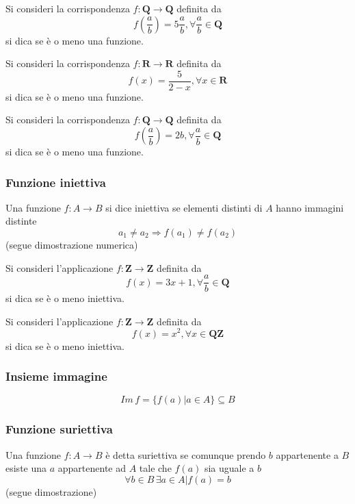 \begin{flushleft}
\begin{esercizio}
Si consideri la corrispondenza $f:\mathbf{Q}\to \mathbf{Q}$ definita da
\[f(\frac{a}{b}) = 5\frac{a}{b}, \forall \frac{a}{b}\in \mathbf{Q}\]
si dica se è o meno una funzione.
\end{esercizio}
\vspace{150px}

\begin{esercizio}
Si consideri la corrispondenza $f:\mathbf{R}\to \mathbf{R}$ definita da
\[f(x) = \frac{5}{2-x}, \forall x\in \mathbf{R}\]
si dica se è o meno una funzione.
\end{esercizio}
\vspace{150px}

\begin{esercizio}
Si consideri la corrispondenza $f:\mathbf{Q}\to \mathbf{Q}$ definita da
\[f(\frac{a}{b}) = 2b, \forall \frac{a}{b}\in \mathbf{Q}\]
si dica se è o meno una funzione.
\end{esercizio}
\vspace{150px}

\subsubsection{Funzione iniettiva}
Una funzione $f:A\to B$ si dice iniettiva se elementi distinti di $A$ hanno immagini distinte
\[a_1 \neq a_2 \Rightarrow f(a_1) \neq f(a_2)\]
(segue dimostrazione numerica)
\\ \vspace{300px}
\begin{esercizio}
Si consideri l'applicazione $f:\mathbf{Z}\to \mathbf{Z}$ definita da
\[f(x) = 3x+1, \forall \frac{a}{b}\in \mathbf{Q}\]
si dica se è o meno iniettiva.
\end{esercizio}
\vspace{150px}

\begin{esercizio}
Si consideri l'applicazione $f:\mathbf{Z}\to \mathbf{Z}$ definita da
\[f(x) = x^2, \forall x\in \mathbf{QZ}\]
si dica se è o meno iniettiva.
\end{esercizio}
\vspace{150px}

\subsubsection{Insieme immagine}
\[Im\,f = \{f(a)|a\in A\}\subseteq B\]

\subsubsection{Funzione suriettiva}
Una funzione $f:A\to B$ è detta suriettiva se comunque prendo $b$ appartenente a $B$ esiste una $a$ appartenente ad $A$ tale che $f(a)$ sia uguale a $b$
\[\forall b\in B\,\exists a\in A|f(a) = b\]
(segue dimostrazione)
\\ \vspace{300px}


\end{flushleft}
